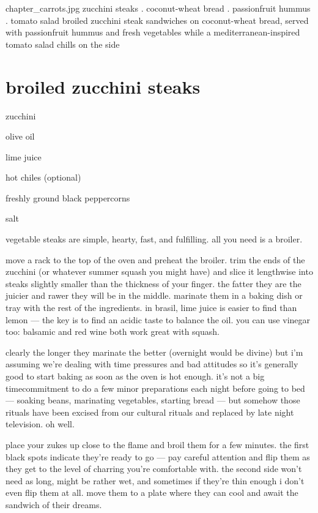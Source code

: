 \mychapter
{chapter_carrots.jpg}
{zucchini steaks . coconut-wheat bread . passionfruit hummus . tomato
salad} {broiled zucchini steak sandwiches on coconut-wheat bread,
served with passionfruit hummus and fresh vegetables while a
mediterranean-inspired tomato salad chills on the side}

\section{broiled zucchini steaks}

\begin{ingredients}
  \item zucchini
  \item olive oil
  \item lime juice
  \item hot chiles (optional)
  \item freshly ground black peppercorns
  \item salt
\end{ingredients}

vegetable steaks are simple, hearty, fast, and fulfilling. all you
need is a broiler.

move a rack to the top of the oven and preheat the broiler. trim the
ends of the zucchini (or whatever summer squash you might have) and
slice it lengthwise into steaks slightly smaller than the thickness of
your finger. the fatter they are the juicier and rawer they will be in
the middle. marinate them in a baking dish or tray with the rest of
the ingredients. in brasil, lime juice is easier to find than lemon
--- the key is to find an acidic taste to balance the oil. you can use
vinegar too: balsamic and red wine both work great with squash.

clearly the longer they marinate the better (overnight would be
divine) but i'm assuming we're dealing with time pressures and bad
attitudes so it's generally good to start baking as soon as the oven
is hot enough. it's not a big timecommitment to do a few minor
preparations each night before going to bed --- soaking beans,
marinating vegetables, starting bread --- but somehow those rituals
have been excised from our cultural rituals and replaced by late night
television. oh well.

place your zukes up close to the flame and broil them for a few
minutes. the first black spots indicate they're ready to go --- pay
careful attention and flip them as they get to the level of charring
you're comfortable with. the second side won't need as long, might be
rather wet, and sometimes if they're thin enough i don't even flip
them at all. move them to a plate where they can cool and await the
sandwich of their dreams.

